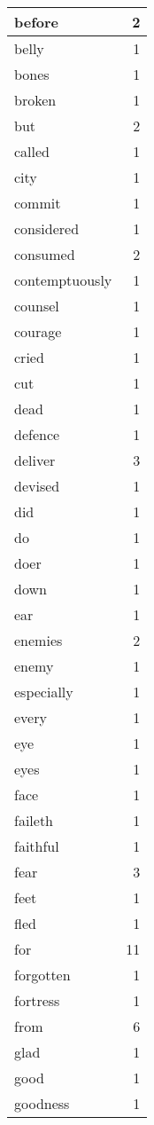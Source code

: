 \begin{center}
\begin{longtable}{l|r}
before & 2 \\ \hline
belly & 1 \\ \hline
bones & 1 \\ \hline
broken & 1 \\ \hline
but & 2 \\ \hline
called & 1 \\ \hline
city & 1 \\ \hline
commit & 1 \\ \hline
considered & 1 \\ \hline
consumed & 2 \\ \hline
contemptuously & 1 \\ \hline
counsel & 1 \\ \hline
courage & 1 \\ \hline
cried & 1 \\ \hline
cut & 1 \\ \hline
dead & 1 \\ \hline
defence & 1 \\ \hline
deliver & 3 \\ \hline
devised & 1 \\ \hline
did & 1 \\ \hline
do & 1 \\ \hline
doer & 1 \\ \hline
down & 1 \\ \hline
ear & 1 \\ \hline
enemies & 2 \\ \hline
enemy & 1 \\ \hline
especially & 1 \\ \hline
every & 1 \\ \hline
eye & 1 \\ \hline
eyes & 1 \\ \hline
face & 1 \\ \hline
faileth & 1 \\ \hline
faithful & 1 \\ \hline
fear & 3 \\ \hline
feet & 1 \\ \hline
fled & 1 \\ \hline
for & 11 \\ \hline
forgotten & 1 \\ \hline
fortress & 1 \\ \hline
from & 6 \\ \hline
glad & 1 \\ \hline
good & 1 \\ \hline
goodness & 1 \\ \hline

\end{longtable}
\end{center}
